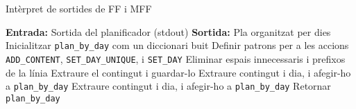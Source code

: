\documentclass[a4paper]{article}
\begin{document}
	\begin{algorithm}[H]
		\caption{Intèrpret de sortides de FF i MFF}\label{alg:ffinterpreter}
		\begin{algorithmic}[1]
			\State \textbf{Entrada:} Sortida del planificador (stdout)
			\State \textbf{Sortida:} Pla organitzat per dies
			\State Inicialitzar \texttt{plan\_by\_day} com un diccionari buit
			\State Definir patrons per a les accions \texttt{ADD\_CONTENT}, \texttt{SET\_DAY\_UNIQUE}, i \texttt{SET\_DAY}
			\State Eliminar espais innecessaris i prefixos de la línia
			\State Extraure el contingut i guardar-lo
			\State Extraure contingut i dia, i afegir-ho a \texttt{plan\_by\_day}
			\State Extraure contingut i dia, i afegir-ho a \texttt{plan\_by\_day}
			\EndIf
			\EndFor
			\State Retornar \texttt{plan\_by\_day}
		\end{algorithmic}
	\end{algorithm}
	
\end{document}

